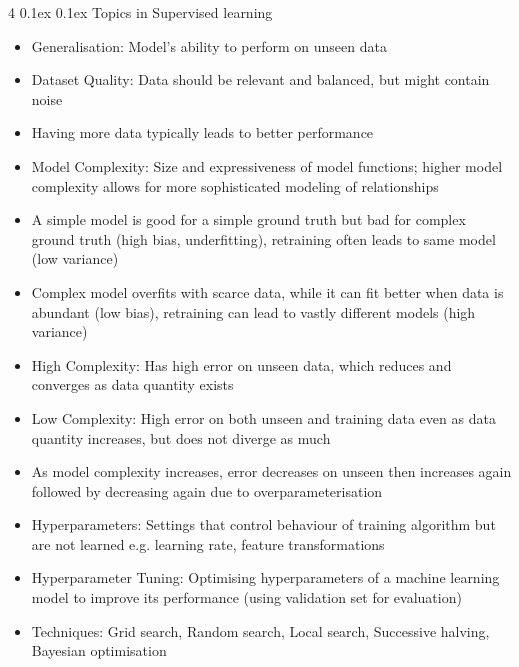 \documentclass[10pt, landscape]{article}
\makeatletter
\renewcommand{\subsection}{\@startsection{subsection}{2}{0mm}%
  {0.1ex} %
  {0.1ex} %
  {\normalfont\normalsize\bfseries}}
\makeatother
\begin{document}
\begin{multicols*}{4}
\subsection{Topics in Supervised learning}
\begin{itemize}
    \item Generalisation: Model's ability to perform on unseen data
    \item Dataset Quality: Data should be relevant and balanced, but might contain noise
    \item Having more data typically leads to better performance
    \item Model Complexity: Size and expressiveness of model functions; higher model complexity allows for more sophisticated modeling of relationships
    \item A simple model is good for a simple ground truth but bad for complex ground truth (high bias, underfitting), retraining often leads to same model (low variance)
    \item Complex model overfits with scarce data, while it can fit better when data is abundant (low bias), retraining can lead to vastly different models (high variance)
    \item High Complexity: Has high error on unseen data, which reduces and converges as data quantity exists
    \item Low Complexity: High error on both unseen and training data even as data quantity increases, but does not diverge as much
    \item As model complexity increases, error decreases on unseen then increases again followed by decreasing again due to overparameterisation
    \item Hyperparameters: Settings that control behaviour of training algorithm but are not learned e.g. learning rate, feature transformations
    \item Hyperparameter Tuning: Optimising hyperparameters of a machine learning model to improve its performance (using validation set for evaluation)
    \item Techniques: Grid search, Random search, Local search, Successive halving, Bayesian optimisation
\end{itemize}


\end{multicols*}
\end{document}
